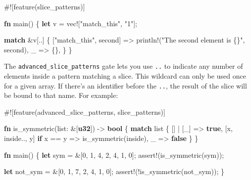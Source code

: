 \documentclass[a4paper,]{book}
\newenvironment{Shaded}{\begin{snugshade}}{\end{snugshade}}
\newcommand{\KeywordTok}[1]{\textcolor[rgb]{0.13,0.29,0.53}{\textbf{{#1}}}}
\newcommand{\DecValTok}[1]{\textcolor[rgb]{0.00,0.00,0.81}{{#1}}}
\newcommand{\StringTok}[1]{\textcolor[rgb]{0.31,0.60,0.02}{{#1}}}
\newcommand{\OtherTok}[1]{\textcolor[rgb]{0.56,0.35,0.01}{{#1}}}
\newcommand{\NormalTok}[1]{{#1}}
\begin{document}
\begin{Shaded}
\begin{Highlighting}[]
\NormalTok{#![feature(slice_patterns)]}

\KeywordTok{fn} \NormalTok{main() \{}
    \KeywordTok{let} \NormalTok{v = }\OtherTok{vec!}\NormalTok{[}\StringTok{"match_this"}\NormalTok{, }\StringTok{"1"}\NormalTok{];}

    \KeywordTok{match} \NormalTok{&v[..] \{}
        \NormalTok{[}\StringTok{"match_this"}\NormalTok{, second] => }\OtherTok{println!}\NormalTok{(}\StringTok{"The second element is \{\}"}\NormalTok{, second),}
        \NormalTok{_ => \{\},}
    \NormalTok{\}}
\NormalTok{\}}
\end{Highlighting}
\end{Shaded}

The \texttt{advanced\_slice\_patterns} gate lets you use \texttt{..} to
indicate any number of elements inside a pattern matching a slice. This
wildcard can only be used once for a given array. If there's an
identifier before the \texttt{..}, the result of the slice will be bound
to that name. For example:

\begin{Shaded}
\begin{Highlighting}[]
\NormalTok{#![feature(advanced_slice_patterns, slice_patterns)]}

\KeywordTok{fn} \NormalTok{is_symmetric(list: &[}\KeywordTok{u32}\NormalTok{]) -> }\KeywordTok{bool} \NormalTok{\{}
    \KeywordTok{match} \NormalTok{list \{}
        \NormalTok{[] | [_] => }\KeywordTok{true}\NormalTok{,}
        \NormalTok{[x, inside.., y] }\KeywordTok{if} \NormalTok{x == y => is_symmetric(inside),}
        \NormalTok{_ => }\KeywordTok{false}
    \NormalTok{\}}
\NormalTok{\}}

\KeywordTok{fn} \NormalTok{main() \{}
    \KeywordTok{let} \NormalTok{sym = &[}\DecValTok{0}\NormalTok{, }\DecValTok{1}\NormalTok{, }\DecValTok{4}\NormalTok{, }\DecValTok{2}\NormalTok{, }\DecValTok{4}\NormalTok{, }\DecValTok{1}\NormalTok{, }\DecValTok{0}\NormalTok{];}
    \OtherTok{assert!}\NormalTok{(is_symmetric(sym));}

    \KeywordTok{let} \NormalTok{not_sym = &[}\DecValTok{0}\NormalTok{, }\DecValTok{1}\NormalTok{, }\DecValTok{7}\NormalTok{, }\DecValTok{2}\NormalTok{, }\DecValTok{4}\NormalTok{, }\DecValTok{1}\NormalTok{, }\DecValTok{0}\NormalTok{];}
    \OtherTok{assert!}\NormalTok{(!is_symmetric(not_sym));}
\NormalTok{\}}
\end{Highlighting}
\end{Shaded}
\end{document}
